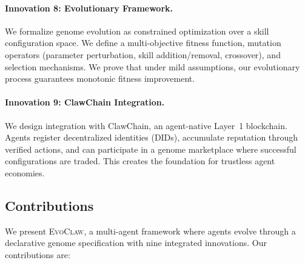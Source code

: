 \documentclass{article}
\newcommand{\evoclaw}{\textsc{EvoClaw}}
\begin{document}
\paragraph{Innovation 8: Evolutionary Framework.} We formalize genome evolution as constrained optimization over a skill configuration space. We define a multi-objective fitness function, mutation operators (parameter perturbation, skill addition/removal, crossover), and selection mechanisms. We prove that under mild assumptions, our evolutionary process guarantees monotonic fitness improvement.

\paragraph{Innovation 9: ClawChain Integration.} We design integration with ClawChain, an agent-native Layer~1 blockchain. Agents register decentralized identities (DIDs), accumulate reputation through verified actions, and can participate in a genome marketplace where successful configurations are traded. This creates the foundation for trustless agent economies.

\subsection{Contributions}

We present \evoclaw{}, a multi-agent framework where agents evolve through a declarative genome specification with nine integrated innovations. Our contributions are:
\end{document}
